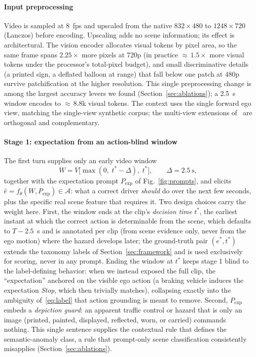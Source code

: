 \documentclass[conference]{IEEEtran}
\newcommand{\Acal}{\mathcal{A}}            %
\begin{document}
\paragraph{Input preprocessing} Video is sampled at 8~fps and upscaled from the native $832\times480$ to $1248\times720$ (Lanczos) before encoding. Upscaling adds no scene information; its effect is architectural. The vision encoder allocates visual tokens by pixel area, so the same frame spans $2.25\times$ more pixels at 720p (in practice ${\approx}\,1.5\times$ more visual tokens under the processor's total-pixel budget), and small discriminative details (a printed sign, a deflated balloon at range) that fall below one patch at 480p survive patchification at the higher resolution. This single preprocessing change is among the largest accuracy levers we found (Section~\ref{sec:ablations}); a 2.5~s window encodes to ${\approx}\,8.8$k visual tokens. The context uses the single forward ego view, matching the single-view synthetic corpus; the multi-view extensions of~\cite{b15,b16,b17,b18} are orthogonal and complementary.

\paragraph{Stage 1: expectation from an action-blind window} The first turn supplies only an early video window
\begin{equation}
W = V\big[\max(0,\; t^* - \Delta),\; t^*\big], \qquad \Delta = 2.5~\mathrm{s},\label{eq:window}
\end{equation}
together with the expectation prompt $P_{\mathrm{exp}}$ of Fig.~\ref{fig:prompts}, and elicits $\hat{e} = f_\theta(W, P_{\mathrm{exp}}) \in \Acal$: what a correct driver \emph{should} do over the next few seconds, plus the specific real scene feature that requires it. Two design choices carry the weight here. First, the window ends at the clip's \emph{decision time} $t^*$, the earliest instant at which the correct action is determinable from the scene, which defaults to $T - 2.5$~s and is annotated per clip (from scene evidence only, never from the ego motion) where the hazard develops later; the ground-truth pair $(e^*, t^*)$ extends the taxonomy labels of Section~\ref{sec:framework} and is used exclusively for scoring, never in any prompt. Ending the window at $t^*$ keeps stage 1 blind to the label-defining behavior: when we instead exposed the full clip, the ``expectation'' anchored on the visible ego action (a braking vehicle induces the expectation \emph{Stop}, which then trivially matches), collapsing exactly into the ambiguity of~\eqref{eq:label} that action grounding is meant to remove. Second, $P_{\mathrm{exp}}$ embeds a \emph{depiction guard}: an apparent traffic control or hazard that is only an image (printed, painted, displayed, reflected, worn, or carried) commands nothing. This single sentence supplies the contextual rule that defines the semantic-anomaly class, a rule that prompt-only scene classification consistently misapplies (Section~\ref{sec:ablations}).
\end{document}
